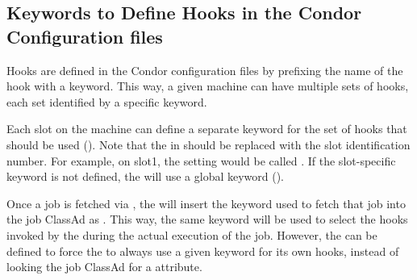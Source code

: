 
% 


\subsection{\label{sec:job-hooks-keywords}
Keywords to Define Hooks in the Condor Configuration files }

Hooks are defined in the Condor configuration files by prefixing
the name of the hook with a keyword.
This way, a given machine can have multiple sets of hooks, each set
identified by a specific keyword.

Each slot on the machine can define a separate keyword for the set
of hooks that should be used ().
Note that the  in  should be replaced with the slot
identification number. 
For example, on slot1, the setting would be
called .
If the slot-specific keyword is not defined, the  will
use a global keyword ().

Once a job is fetched via , the
 will insert the keyword used to fetch that job into
the job ClassAd as .
This way, the same keyword will be used to select the hooks invoked by
the  during the actual execution of the job.
However, the  can be defined to
force the  to always use a given keyword for its own
hooks, instead of looking the job ClassAd for a 
attribute.

